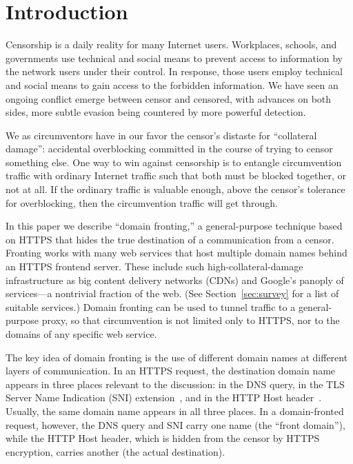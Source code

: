 \documentclass{sig-alternate}
\begin{document}
\section{Introduction}


Censorship is a daily reality for many Internet users.
Workplaces, schools, and governments use technical and social means
to prevent access to information by the network users under their control.
In response, those users employ technical and social means
to gain access to the forbidden information.
We have seen
an ongoing conflict emerge between censor and censored,
with advances on both sides, more subtle evasion being countered by more powerful detection.

We as circumventors have in our favor the censor's
distaste for ``collateral damage'':
accidental overblocking committed in the course of trying to censor something else.
One way to win against censorship is to entangle circumvention traffic
with ordinary Internet traffic such that both must be blocked together,
or not at all.
If the ordinary traffic is valuable enough,
above the censor's tolerance for overblocking,
then the circumvention traffic will get through.

In this paper we describe ``domain fronting,'' a general-purpose technique
based on HTTPS that hides the true destination of a communication
from a censor.
Fronting works with many web services that host multiple domain names
behind an HTTPS frontend server.
These include such high-collateral-damage infrastructure as
big content delivery networks (CDNs)
and Google's panoply of services---a nontrivial fraction of the web.
(See Section~\ref{sec:survey} for a list of suitable services.)
Domain fronting can be used to tunnel traffic
to a general-purpose proxy,
so that circumvention is not limited only to HTTPS, nor to the domains of any specific web service.

The key idea of domain fronting is the use of
different domain names at different layers of communication.
In an HTTPS request, the destination domain name appears
in three places relevant to the discussion:
in the DNS query,
in the TLS Server Name Indication (SNI) extension~\cite[\S 3]{rfc6066},
and in the HTTP Host header~\cite[\S 14.23]{rfc2616}.
Usually, the same domain name appears in all three places.
In a domain-fronted request, however,
the DNS query and SNI carry one name (the ``front domain''),
while the HTTP Host header,
which is hidden from the censor by HTTPS encryption,
carries another (the actual destination).
\end{document}
